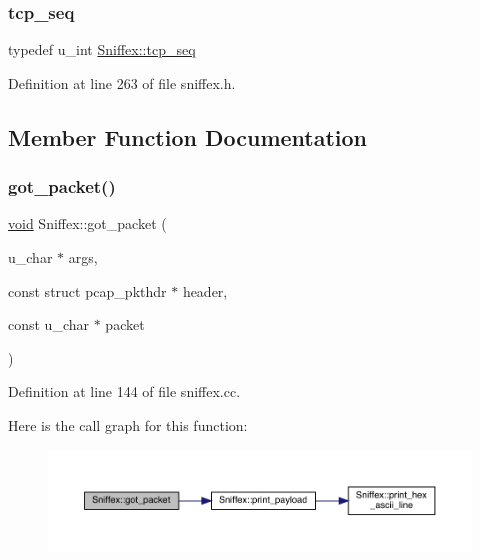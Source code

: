 \subsubsection{\texorpdfstring{tcp\+\_\+seq}{tcp\_seq}}
{\footnotesize\ttfamily typedef u\+\_\+int \mbox{\hyperlink{class_sniffex_a83629f6a3ec687dd2bb381e9bf157d4f}{Sniffex\+::tcp\+\_\+seq}}}



Definition at line 263 of file sniffex.\+h.



\subsection{Member Function Documentation}
\mbox{\label{class_sniffex_a3d4ef3c90e55035eadca2d577004cd14}} 
\subsubsection{\texorpdfstring{got\+\_\+packet()}{got\_packet()}}
{\footnotesize\ttfamily \mbox{\hyperlink{glad_8h_a950fc91edb4504f62f1c577bf4727c29}{void}} Sniffex\+::got\+\_\+packet (\begin{DoxyParamCaption}\item[{u\+\_\+char $\ast$}]{args,  }\item[{const struct pcap\+\_\+pkthdr $\ast$}]{header,  }\item[{const u\+\_\+char $\ast$}]{packet }\end{DoxyParamCaption})}



Definition at line 144 of file sniffex.\+cc.

Here is the call graph for this function\+:\nopagebreak
\begin{figure}[H]
\begin{center}
\leavevmode
\includegraphics[width=350pt]{class_sniffex_a3d4ef3c90e55035eadca2d577004cd14_cgraph}
\end{center}
\end{figure}
\mbox{\label{class_sniffex_ab32951f576e7cd62caf4fe1c5b085b4e}} 
